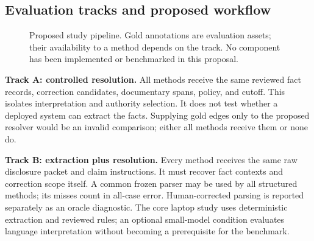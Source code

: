 \documentclass[11pt,a4paper]{article}
\newcommand{\lead}[1]{\textbf{\color{navy}#1}}
\begin{document}
\subsection{Evaluation tracks and proposed workflow}
\begin{figure}[H]\centering
{}
\caption{Proposed study pipeline. Gold annotations are evaluation assets; their availability to a method depends on the track. No component has been implemented or benchmarked in this proposal.}
\end{figure}

\lead{Track A: controlled resolution.} All methods receive the same reviewed fact records, correction candidates, documentary spans, policy, and cutoff. This isolates interpretation and authority selection. It does not test whether a deployed system can extract the facts. Supplying gold edges only to the proposed resolver would be an invalid comparison; either all methods receive them or none do.

\lead{Track B: extraction plus resolution.} Every method receives the same raw disclosure packet and claim instructions. It must recover fact contexts and correction scope itself. A common frozen parser may be used by all structured methods; its misses count in all-case error. Human-corrected parsing is reported separately as an oracle diagnostic. The core laptop study uses deterministic extraction and reviewed rules; an optional small-model condition evaluates language interpretation without becoming a prerequisite for the benchmark.
\end{document}
